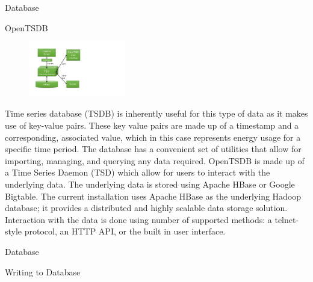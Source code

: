 \documentclass[8pt,xcolor={dvipsnames}]{beamer}
\begin{document}
{\begin{frame}{Database}
\begin{block}{OpenTSDB}

\begin{figure}
	\begin{center}
		\includegraphics[width=0.38\textwidth, trim=65 80 450 60, clip]{OpenTSDBNo}
	\end{center}
\end{figure}

Time series database (TSDB) is inherently useful for this type of data as it makes use of key-value pairs. These key value pairs are made up of a timestamp and a corresponding, associated value, which in this case represents energy usage for a specific time period.
The database has a convenient set of utilities that allow for importing, managing, and querying any data required. OpenTSDB is made up of a Time Series Daemon (TSD) which allow for users to interact with the underlying data. The underlying data is stored using Apache HBase or Google Bigtable.
The current installation uses Apache HBase as the underlying Hadoop database; it provides a distributed and  highly scalable data storage solution.
Interaction with the data is done using number of supported methods: a telnet-style protocol, an HTTP API, or the built in user interface.
	
	
\end{block}

\end{frame}

\begin{frame}{Database}

\begin{block}{Writing to Database}


\end{block}
\end{frame}}
\end{document}
